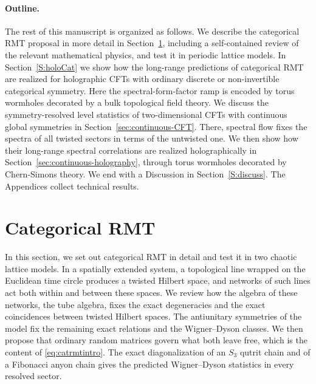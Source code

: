 \documentclass[11pt]{article}
\numberwithin{equation}{section}
\begin{document}
\vspace{-.2cm}
\paragraph{Outline.}

The rest of this manuscript is organized as follows. We describe the categorical RMT proposal in more detail in Section~\ref{sec:categorical-RMT}, including a self-contained review of the relevant mathematical physics, and test it in periodic lattice models. In Section~\ref{S:holoCat} we show how the long-range predictions of categorical RMT are realized for holographic CFTs with ordinary discrete or non-invertible categorical symmetry. Here the spectral-form-factor ramp is encoded by torus wormholes decorated by a bulk topological field theory. We discuss the symmetry-resolved level statistics of two-dimensional CFTs with continuous global symmetries in Section~\ref{sec:continuous-CFT}. There, spectral flow fixes the spectra of all twisted sectors in terms of the untwisted one. We then show how their long-range spectral correlations are realized holographically in Section~\ref{sec:continuous-holography}, through torus wormholes decorated by Chern-Simons theory. We end with a Discussion in Section~\ref{S:discuss}. The Appendices collect technical results.


\section{Categorical RMT}
\label{sec:categorical-RMT}

In this section, we set out categorical RMT in detail and test it in two chaotic lattice models.
In a spatially extended system, a topological line wrapped on the Euclidean time circle produces a twisted Hilbert space,
and networks of such lines act both within and between these spaces. We review how the algebra of
these networks, the tube algebra, fixes the exact degeneracies and the exact coincidences between
twisted Hilbert spaces. The antiunitary symmetries of the model fix the remaining exact relations
and the Wigner--Dyson classes. We then propose that ordinary random matrices govern what both leave
free, which is the content of \eqref{eq:catrmtintro}. The exact diagonalization of an $S_3$ qutrit chain and
of a Fibonacci anyon chain gives the predicted Wigner--Dyson statistics in every resolved sector.
\end{document}
